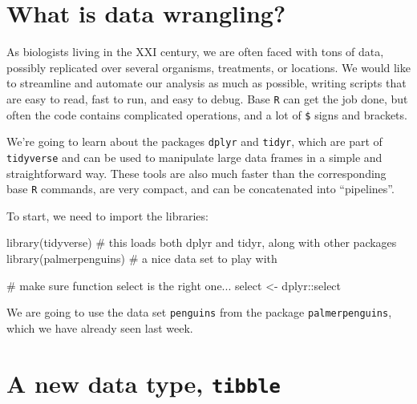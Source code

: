\documentclass[
  letterpaper,
  DIV=11,
  numbers=noendperiod]{scrreprt}
\newenvironment{Shaded}{\begin{snugshade}}{\end{snugshade}}
\newcommand{\CommentTok}[1]{\textcolor[rgb]{0.37,0.37,0.37}{#1}}
\newcommand{\FunctionTok}[1]{\textcolor[rgb]{0.28,0.35,0.67}{#1}}
\newcommand{\NormalTok}[1]{\textcolor[rgb]{0.00,0.23,0.31}{#1}}
\newcommand{\OtherTok}[1]{\textcolor[rgb]{0.00,0.23,0.31}{#1}}
\newcommand{\SpecialCharTok}[1]{\textcolor[rgb]{0.37,0.37,0.37}{#1}}
\begin{document}
\hypertarget{what-is-data-wrangling}{%
\section{What is data wrangling?}\label{what-is-data-wrangling}}

As biologists living in the XXI century, we are often faced with tons of
data, possibly replicated over several organisms, treatments, or
locations. We would like to streamline and automate our analysis as much
as possible, writing scripts that are easy to read, fast to run, and
easy to debug. Base \texttt{R} can get the job done, but often the code
contains complicated operations, and a lot of \texttt{\$} signs and
brackets.

We're going to learn about the packages \texttt{dplyr} and
\texttt{tidyr}, which are part of \texttt{tidyverse} and can be used to
manipulate large data frames in a simple and straightforward way. These
tools are also much faster than the corresponding base \texttt{R}
commands, are very compact, and can be concatenated into ``pipelines''.

To start, we need to import the libraries:

\begin{Shaded}
\begin{Highlighting}[]
\FunctionTok{library}\NormalTok{(tidyverse) }\CommentTok{\# this loads both dplyr and tidyr, along with other packages}
\FunctionTok{library}\NormalTok{(palmerpenguins) }\CommentTok{\# a nice data set to play with}
\end{Highlighting}
\end{Shaded}

\begin{Shaded}
\begin{Highlighting}[]
\CommentTok{\# make sure function select is the right one...}
\NormalTok{select }\OtherTok{\textless{}{-}}\NormalTok{ dplyr}\SpecialCharTok{::}\NormalTok{select}
\end{Highlighting}
\end{Shaded}

We are going to use the data set \texttt{penguins} from the package
\texttt{palmerpenguins}, which we have already seen last week.

\hypertarget{a-new-data-type-tibble}{%
\section{\texorpdfstring{A new data type,
\texttt{tibble}}{A new data type, tibble}}\label{a-new-data-type-tibble}}
\end{document}
